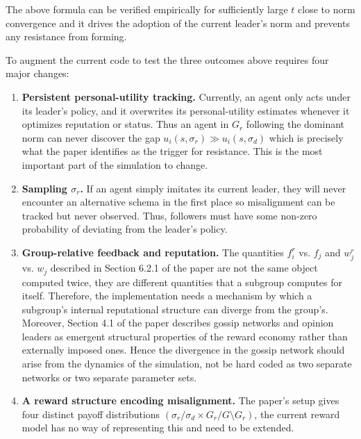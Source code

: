 \documentclass[12pt]{article}
\begin{document}
The above formula can be verified empirically for sufficiently large $t$ close to norm convergence and it drives
the adoption of the current leader's norm and prevents any resistance from forming.

To augment the current code to test the three outcomes above requires four major changes:
\begin{enumerate}
    \item[1.] \textbf{Persistent personal-utility tracking.} Currently, an agent only acts under its leader's policy,
    and it overwrites its personal-utility estimates whenever it optimizes reputation or status. Thus an agent in $G_r$
    following the dominant norm can never discover the gap $u_i(s, \sigma_r) \gg u_i(s, \sigma_d)$ which is precisely
    what the paper identifies as the trigger for resistance. This is the most important part of the simulation to change.
    \item[2.] \textbf{Sampling $\sigma_r$.} If an agent simply imitates its current leader,
    they will never encounter an alternative schema in the first place so misalignment can be tracked
    but never observed. Thus, followers must have some non-zero probability of deviating from the leader's policy.
    \item[3.] \textbf{Group-relative feedback and reputation.} The quantities $f^r_i$ vs. $f_j$ and $w^r_j$ vs. $w_j$
    described in Section 6.2.1 of the paper are not the same object computed twice, they are different quantities that a subgroup
    computes for itself. Therefore, the implementation needs a mechanism by which a subgroup's internal reputational
    structure can diverge from the group's. Moreover, Section 4.1 of the paper describes gossip networks and opinion leaders
    as emergent structural properties of the reward economy rather than externally imposed ones. Hence the divergence
    in the gossip network should arise from the dynamics of the simulation, not be hard coded as two separate networks
    or two separate parameter sets.
    \item[4.] \textbf{A reward structure encoding misalignment.} The paper's setup gives four
    distinct payoff distributions $(\sigma_r/\sigma_d \times G_r / G \setminus G_r)$, the current reward model
    has no way of representing this and need to be extended.
\end{enumerate}
\end{document}
